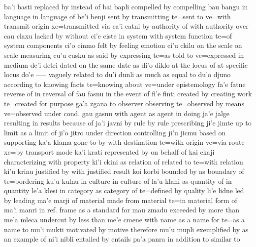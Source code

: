    ba'i    basti   replaced by instead of
    bai bapli   compelled by    compelling
    bau bangu   in language in language of
    be'i    benji   sent by     transmitting
            te=sent to  ve=with transmit origin
            xe=transmitted via
    ca'i    catni   by authority of with authority over
    cau claxu   lacked by   without
    ci'e    ciste   in system   with system function
            te=of system components
    ci'o    cinmo   felt by     feeling emotion
    ci'u    ckilu   on the scale    on scale measuring
    cu'u    cusku   as said by  expressing
            te=as told to   ve=expressed in medium
    de'i    detri   dated       on the same date as
    di'o    diklo   at the locus of at specific locus
    do'e    -----   vaguely related to
    du'i    dunli   as much as  equal to
    du'o    djuno   according to    knowing facts
            te=knowing about
                    ve=under epistemology
    fa'e    fatne   reverse of  in reversal of
    fau fasnu   in the event of
    fi'e    finti   created by  creating work
            te=created for purpose
    ga'a    zgana   to observer observing
            te=observed by means
                    ve=observed under cond.
    gau gasnu   with agent  as agent in doing
    ja'e    jalge   resulting in    results because of
    ja'i    javni   by rule     by rule prescribing
    ji'e    jimte   up to limit as a limit of
    ji'o    jitro   under direction controlling
    ji'u    jicmu   based on    supporting
    ka'a    klama   gone to by  with destination
            te=with origin  ve=via route
            xe=by transport mode
    ka'i    krati   represented by  on behalf of
    kai ckaji   characterizing  with property
    ki'i    ckini   as relation of  related to
            te=with relation
    ki'u    krinu   justified by    with justified result
    koi korbi   bounded by  as boundary of
            te=bordering
    ku'u    kulnu   in culture  in culture of
    la'u    klani   as quantity of  in quantity
    le'a    klesi   in category as category of
            te=defined by quality
    li'e    lidne   led by      leading
    ma'e    marji   of material made from material
            te=in material form of
    ma'i    manri   in ref. frame   as a standard for
    mau zmadu   exceeded by more than
    me'a    mleca   undercut by less than
    me'e    cmene   with name   as a name for
            te=as a name to
    mu'i    mukti   motivated by    motive therefore
    mu'u    mupli   exemplified by  as an example of
    ni'i    nibli   entailed by entails
    pa'a    panra   in addition to  similar to
